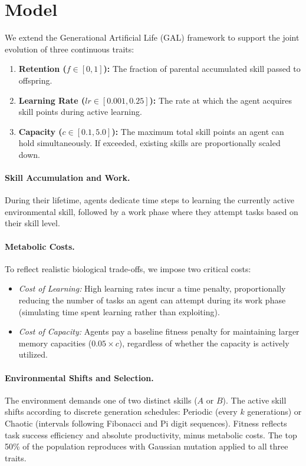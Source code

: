 \documentclass[11pt,a4paper]{article}
\begin{document}
\section{Model}
We extend the Generational Artificial Life (GAL) framework to support the joint evolution of three continuous traits:
\begin{enumerate}
    \item \textbf{Retention ($f \in [0, 1]$):} The fraction of parental accumulated skill passed to offspring.
    \item \textbf{Learning Rate ($lr \in [0.001, 0.25]$):} The rate at which the agent acquires skill points during active learning.
    \item \textbf{Capacity ($c \in [0.1, 5.0]$):} The maximum total skill points an agent can hold simultaneously. If exceeded, existing skills are proportionally scaled down.
\end{enumerate}

\paragraph{Skill Accumulation and Work.}
During their lifetime, agents dedicate time steps to learning the currently active environmental skill, followed by a work phase where they attempt tasks based on their skill level.

\paragraph{Metabolic Costs.}
To reflect realistic biological trade-offs, we impose two critical costs:
\begin{itemize}
    \item \textit{Cost of Learning:} High learning rates incur a time penalty, proportionally reducing the number of tasks an agent can attempt during its work phase (simulating time spent learning rather than exploiting).
    \item \textit{Cost of Capacity:} Agents pay a baseline fitness penalty for maintaining larger memory capacities ($0.05 \times c$), regardless of whether the capacity is actively utilized.
\end{itemize}

\paragraph{Environmental Shifts and Selection.}
The environment demands one of two distinct skills ($A$ or $B$). The active skill shifts according to discrete generation schedules: Periodic (every $k$ generations) or Chaotic (intervals following Fibonacci and Pi digit sequences). Fitness reflects task success efficiency and absolute productivity, minus metabolic costs. The top 50\% of the population reproduces with Gaussian mutation applied to all three traits.
\end{document}
